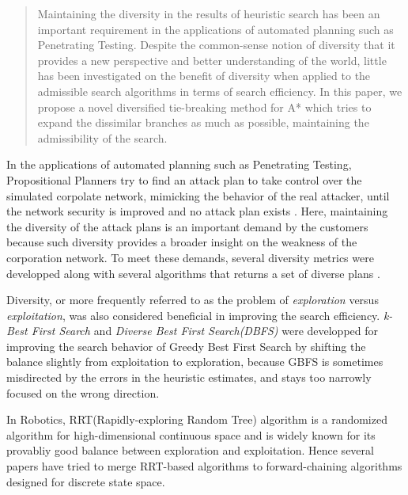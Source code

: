 
\begin{abstract}
Maintaining the diversity in the results of heuristic search has been an
important requirement in the applications of automated planning such as
Penetrating Testing.
Despite the common-sense notion of diversity that it provides a new
perspective and better understanding of the world, little has been investigated on the
benefit of diversity when applied to the admissible search algorithms in terms of search efficiency.
In this paper, we propose a novel 
diversified tie-breaking method for A* 
which tries to expand the dissimilar branches as much as possible,
maintaining the admissibility of the search.
\end{abstract}


In the applications of automated planning such as Penetrating Testing, Propositional Planners try to find an attack plan to take control over the simulated corpolate network, mimicking the behavior of the real attacker, until the network security is improved and no attack plan exists \cite{boddy2005course}.  Here, maintaining the diversity of the attack plans is an important demand by the customers because such diversity provides a broader insight on the weakness of the corporation network. To meet these demands, several diversity metrics were developped \cite{roberts2014evaluating,goldman2015measuring} along with several algorithms that returns a set of diverse plans \cite{srivastava2007domain,coman2011generating,nguyen2012generating}.

Diversity, or more frequently referred to as the problem of \emph{exploration} versus
\emph{exploitation}, was also considered beneficial in improving the search efficiency.
\emph{k-Best First Search} \cite{felner2003kbfs} and \emph{Diverse Best First Search(DBFS)}
\cite{imai2011novel} were developped for
improving the search behavior of Greedy Best First Search by shifting the
balance slightly from exploitation to exploration, because GBFS
is sometimes misdirected by the errors in the heuristic estimates,
and stays too narrowly focused on the wrong direction.

In Robotics, RRT(Rapidly-exploring Random Tree) algorithm is a \sota randomized algorithm for high-dimensional continuous space and is widely known for its provabliy good balance between exploration and exploitation. Hence several papers \cite{alcazar2011adapting,burfoot2006rrt,likhachev2008r} have tried to merge RRT-based algorithms to forward-chaining algorithms designed for discrete state space.

